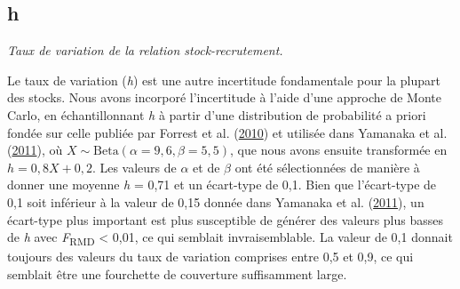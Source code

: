 \documentclass[11pt]{book}
\begin{document}
\subsection{h}

\emph{Taux de variation de la relation stock-recrutement.}

Le taux de variation (\emph{h}) est une autre incertitude fondamentale pour la plupart des stocks. Nous avons incorporé l'incertitude à l'aide d'une approche de Monte Carlo, en échantillonnant \emph{h} à partir d'une distribution de probabilité a priori fondée sur celle publiée par Forrest et al. (\protect\hyperlink{ref-forrest2010}{2010}) et utilisée dans Yamanaka et al. (\protect\hyperlink{ref-yamanaka2011}{2011}), où \(X \sim \textrm{Beta}(\alpha = 9,6, \beta = 5,5)\), que nous avons ensuite transformée en \(h = 0,8 X + 0,2\). Les valeurs de \(\alpha\) et de \(\beta\) ont été sélectionnées de manière à donner une moyenne \emph{h} = 0,71 et un écart-type de 0,1. Bien que l'écart-type de 0,1 soit inférieur à la valeur de 0,15 donnée dans Yamanaka et al. (\protect\hyperlink{ref-yamanaka2011}{2011}), un écart-type plus important est plus susceptible de générer des valeurs plus basses de \emph{h} avec \emph{F}\textsubscript{RMD} \textless{} 0,01, ce qui semblait invraisemblable. La valeur de 0,1 donnait toujours des valeurs du taux de variation comprises entre 0,5 et 0,9, ce qui semblait être une fourchette de couverture suffisamment large.
\end{document}
